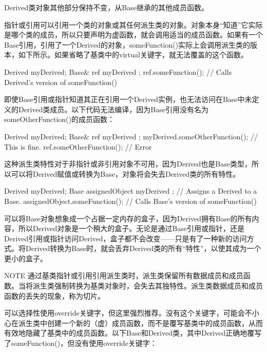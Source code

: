 Derived类对象其他部分保持不变，从Base继承的其他成员函数。

指针或引用可以引用一个类的对象或其任何派生类的对象。对象本身“知道”它实际是哪个类的成员，所以只要声明为虚函数，就会调用适当的成员函数。如果有一个Base引用，引用了一个Derived的对象，someFunction()实际上会调用派生类的版本，如下所示。如果省略了基类中的virtual关键字，就无法覆盖的这个函数。

\begin{cpp}
Derived myDerived;
Base& ref { myDerived };
ref.someFunction(); // Calls Derived's version of someFunction()
\end{cpp}

即使Base引用或指针知道其正在引用一个Derived实例，也无法访问在Base中未定义的Derived类成员。以下代码无法编译，因为Base引用没有名为someOtherFunction()的成员函数：

\begin{cpp}
Derived myDerived;
Base& ref { myDerived };
myDerived.someOtherFunction(); // This is fine.
ref.someOtherFunction(); // Error
\end{cpp}

这种派生类特性对于非指针或非引用对象不可用，因为Derived也是Base类型，所以可以将Derived赋值或转换为Base，对象将会失去Derived类的所有特性。

\begin{cpp}
Derived myDerived;
Base assignedObject { myDerived }; // Assigns a Derived to a Base.
assignedObject.someFunction(); // Calls Base's version of someFunction()
\end{cpp}

可以将Base对象想象成一个占据一定内存的盒子，因为Derived拥有Base的所有内容，所以Derived对象是一个稍大的盒子。无论是通过Base引用或指针，还是Derived引用或指针访问Derived，盒子都不会改变——只是有了一种新的访问方式。将Derived转换为Base时，就会丢弃Derived类的所有“特性”，以使其成为一个更小的盒子。

\begin{myNotic}{NOTE}
通过基类指针或引用引用派生类时，派生类保留所有数据成员和成员函数。当将派生类强制转换为基类对象时，会失去其独特性。派生类数据成员和成员函数的丢失的现象，称为切片。
\end{myNotic}


可以选择性使用override关键字，但这里强烈推荐。没有这个关键字，可能会不小心在派生类中创建一个新的（虚）成员函数，而不是覆写基类中的成员函数，从而有效地隐藏了基类中的成员函数。以下Base和Derived类，其中Derived正确地覆写了someFunction()，但没有使用override关键字：

